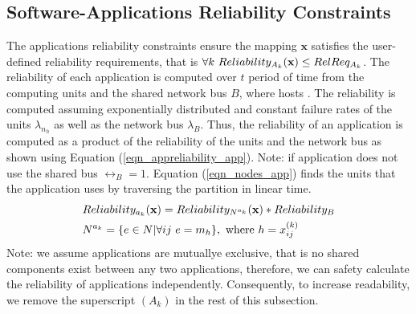 \subsection{Software-Applications Reliability Constraints}\label{subsec_reliability_constraint}
The applications reliability constraints ensure the mapping $\textbf{x}$ satisfies the user-defined reliability requirements, that is $\forall k\ Reliability_{A_k}(\textbf{x})\leq RelReq_{A_k}$. 
The reliability of each application is computed over $t$ period of time from the computing units  and  the shared network bus $B$, where  hosts \ttar. The reliability is computed assuming exponentially distributed and constant failure rates of the units $\lambda_{n_h}$ as well as the network bus $\lambda_B$. Thus, the reliability of an application is computed as a product of the reliability of the units and the network bus as shown using Equation (\ref{eqn_appreliability_app}). Note: if application does not use the shared  bus $\rel_{B}=1$. Equation (\ref{eqn_nodes_app}) finds the units  that the application \ttar uses by traversing the partition \ttx in linear time.
\begin{align}
	\label{eqn_appreliability_app}
	&Reliability_{\ar}(\x)=Reliability_{\ssp{N}}(\x)*Reliability_B\\
	\label{eqn_nodes_app}
	&\ssp{N}=\{e\in N| \forall ij\ e=m_h\},\mbox{ where } h=\ssx{k}{ij}
\end{align}
Note: we assume applications are mutuallye exclusive, that is no shared components exist between any two applications, therefore, we can safety calculate the reliability of applications independently. Consequently, to increase readability, we remove the superscript $(A_k)$ in the rest of this subsection.

